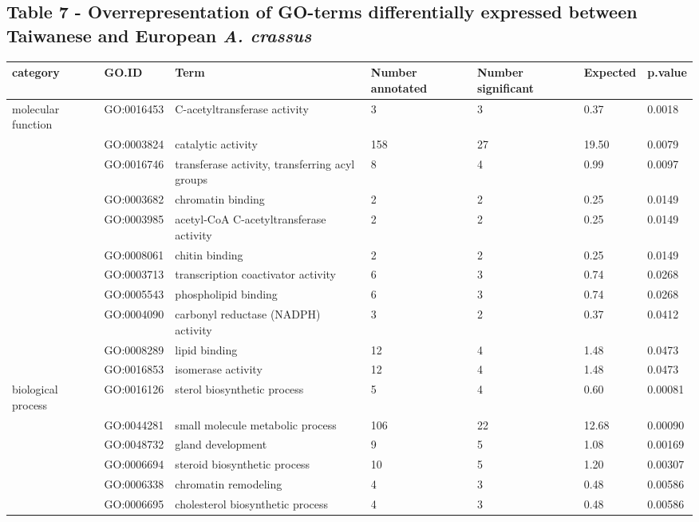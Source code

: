 \documentclass[10pt]{bmc_article}
\newenvironment{bmcformat}{\begin{raggedright}\baselineskip20pt\sloppy\setboolean{publ}{false}}{\end{raggedright}\baselineskip20pt\sloppy}
\begin{document}
\begin{bmcformat}
\subsection*{Table 7 - Overrepresentation of GO-terms differentially
  expressed between Taiwanese and European \textit{A. crassus}}

\begin{longtable}{p{1.7cm}lp{4.5cm}p{1cm}p{1cm}ll}
 category & GO.ID & Term & Number annotated & Number significant & Expected & p.value \\ 
  \hline
molecular function & GO:0016453 & C-acetyltransferase activity &   3 &   3 & 0.37 & 0.0018 \\ 
   & GO:0003824 & catalytic activity & 158 &  27 & 19.50 & 0.0079 \\ 
   & GO:0016746 & transferase activity, transferring acyl groups &   8 &   4 & 0.99 & 0.0097 \\ 
   & GO:0003682 & chromatin binding &   2 &   2 & 0.25 & 0.0149 \\ 
   & GO:0003985 & acetyl-CoA C-acetyltransferase activity &   2 &   2 & 0.25 & 0.0149 \\ 
   & GO:0008061 & chitin binding &   2 &   2 & 0.25 & 0.0149 \\ 
   & GO:0003713 & transcription coactivator activity &   6 &   3 & 0.74 & 0.0268 \\ 
   & GO:0005543 & phospholipid binding &   6 &   3 & 0.74 & 0.0268 \\ 
   & GO:0004090 & carbonyl reductase (NADPH) activity &   3 &   2 & 0.37 & 0.0412 \\ 
   & GO:0008289 & lipid binding &  12 &   4 & 1.48 & 0.0473 \\ 
   & GO:0016853 & isomerase activity &  12 &   4 & 1.48 & 0.0473 \\ 
   \hline
biological process & GO:0016126 & sterol biosynthetic process &   5 &   4 & 0.60 & 0.00081 \\ 
   & GO:0044281 & small molecule metabolic process & 106 &  22 & 12.68 & 0.00090 \\ 
   & GO:0048732 & gland development &   9 &   5 & 1.08 & 0.00169 \\ 
   & GO:0006694 & steroid biosynthetic process &  10 &   5 & 1.20 & 0.00307 \\ 
   & GO:0006338 & chromatin remodeling &   4 &   3 & 0.48 & 0.00586 \\ 
   & GO:0006695 & cholesterol biosynthetic process &   4 &   3 & 0.48 & 0.00586 \\ 

\end{longtable}
\end{bmcformat}
\end{document}
